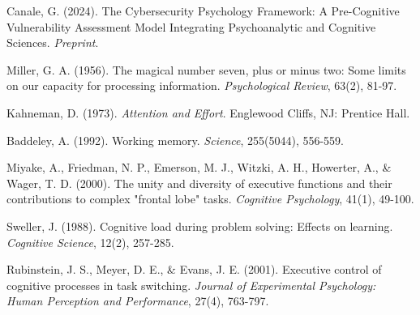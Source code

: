 \documentclass[11pt,a4paper]{article}
\begin{document}
\begin{thebibliography}{9}

Canale, G. (2024). The Cybersecurity Psychology Framework: A Pre-Cognitive Vulnerability Assessment Model Integrating Psychoanalytic and Cognitive Sciences. \textit{Preprint}.

Miller, G. A. (1956). The magical number seven, plus or minus two: Some limits on our capacity for processing information. \textit{Psychological Review}, 63(2), 81-97.

Kahneman, D. (1973). \textit{Attention and Effort}. Englewood Cliffs, NJ: Prentice Hall.

Baddeley, A. (1992). Working memory. \textit{Science}, 255(5044), 556-559.

Miyake, A., Friedman, N. P., Emerson, M. J., Witzki, A. H., Howerter, A., \& Wager, T. D. (2000). The unity and diversity of executive functions and their contributions to complex "frontal lobe" tasks. \textit{Cognitive Psychology}, 41(1), 49-100.

Sweller, J. (1988). Cognitive load during problem solving: Effects on learning. \textit{Cognitive Science}, 12(2), 257-285.

Rubinstein, J. S., Meyer, D. E., \& Evans, J. E. (2001). Executive control of cognitive processes in task switching. \textit{Journal of Experimental Psychology: Human Perception and Performance}, 27(4), 763-797.

\end{thebibliography}
\end{document}

